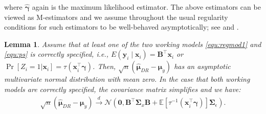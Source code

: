 \documentclass[12pt, A4]{article}
\newtheorem{lemma}{Lemma}
\newcommand{\ObsRes}{\textbf{y}_i}
\newcommand{\ObsCov}{\textbf{x}_i}
\newcommand{\LogCoe}{\boldsymbol{\gamma}}
\begin{document}
    where $\hat{\LogCoe}$ again is the maximum likelihood estimator. The above estimators can be viewed as M-estimators and we assume throughout the usual regularity conditions for such estimators to be well-behaved asymptotically; see \cite{NEWEY19942111} and \citet[][Suppl Material]{CANTONI2020108}.
    \begin{lemma}\label{lemma:finite_DR}
       Assume that at least one of the two working models \eqref{equ:regmod1} and \eqref{equ:ps} is correctly specified, i.e., $E(\ObsRes \mid \ObsCov)= \textbf{B}^{\top} \ObsCov$ or $\Pr[ Z_i=1 | \ObsCov ]= \tau(\ObsCov^{\top} \LogCoe)$. Then,  $\sqrt{n}(\hat{\boldsymbol{\mu}}_{DR} - \boldsymbol{\mu}_y)$ has an asymptotic multivariate normal distribution with mean zero. In the case that both working models are correctly specified, the covariance matrix simplifies and we have:
       \begin{align*}
           \sqrt{n}(\hat{\boldsymbol{\mu}}_{DR} - \boldsymbol{\mu}_y) \overset{d}{\rightarrow} \mathcal{N}\left(\textbf{0}, \textbf{B}^{\top} \boldsymbol{\Sigma}_{x} \textbf{B} + \mathbb{E} [\tau^{-1}(\ObsCov^{\top}\LogCoe)] \boldsymbol{\Sigma}_{\epsilon}\right).
       \end{align*} 
    \end{lemma}
\end{document}
